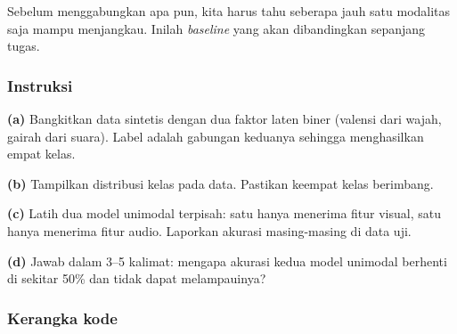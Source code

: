 \documentclass[12pt, a4paper]{article}
\begin{document}
Sebelum menggabungkan apa pun, kita harus tahu seberapa jauh satu modalitas saja mampu
menjangkau. Inilah \emph{baseline} yang akan dibandingkan sepanjang tugas.

\subsubsection{Instruksi}
\label{sec:soal1-instruksi}

\textbf{(a)} Bangkitkan data sintetis dengan dua faktor laten biner (valensi dari wajah,
gairah dari suara). Label adalah gabungan keduanya sehingga menghasilkan empat kelas.

\textbf{(b)} Tampilkan distribusi kelas pada data. Pastikan keempat kelas berimbang.

\textbf{(c)} Latih dua model unimodal terpisah: satu hanya menerima fitur visual, satu
hanya menerima fitur audio. Laporkan akurasi masing-masing di data uji.

\textbf{(d)} Jawab dalam 3--5 kalimat: mengapa akurasi kedua model unimodal berhenti di
sekitar 50\% dan tidak dapat melampauinya?
\subsubsection{Kerangka kode}
\label{sec:soal1-kode}
\end{document}
